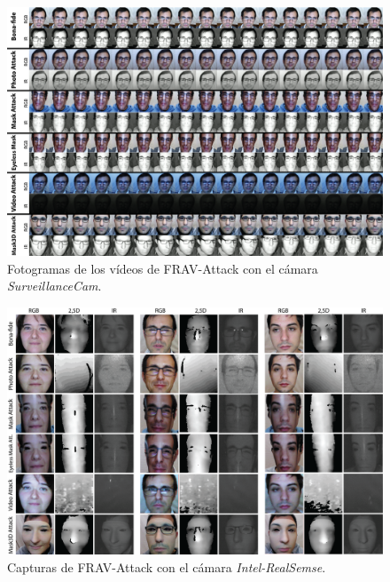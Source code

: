 \begin{landscape}
\begin{figure}[t!]
\centering
\includegraphics[width=1.4\textwidth]{ch-sistemasABC/images/ch-BBDDs/MUESTRAS_IR.png}
    \caption{Fotogramas de los vídeos de \Gls{FRAV-Attack} con el cámara \textit{SurveillanceCam}.}
    \label{fig:MUESTRAS_IR}
\end{figure}
\end{landscape}

\begin{landscape}
\begin{figure}
    \centering
    \includegraphics[width=1.4\textwidth]{ch-sistemasABC/images/ch-BBDDs/USUARIOS_REAL_SENSE.png}
    \caption{Capturas de \Gls{FRAV-Attack} con el cámara \textit{Intel-RealSemse}.}
    \label{fig:USUARIOS_RELASENSE}
\end{figure}
\end{landscape}

